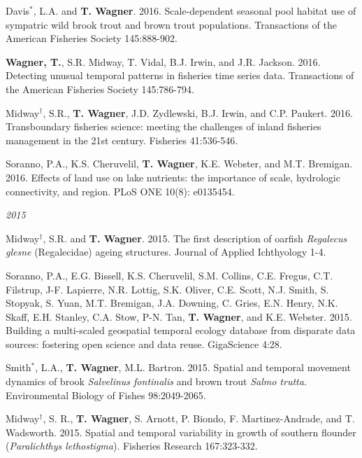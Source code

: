 \documentclass[10pt]{article}
\begin{document}
\begin{flushleft}
\begin{etaremune}[start=55]
\item Davis$^*$, L.A. and {\bf T. Wagner}. 2016. Scale-dependent seasonal pool habitat use of sympatric wild brook trout and brown trout populations. Transactions of the American Fisheries Society 145:888-902.

\item {\bf Wagner, T.}, S.R. Midway, T. Vidal, B.J. Irwin, and J.R. Jackson. 2016. Detecting unusual temporal patterns in fisheries time series data. Transactions of the American Fisheries Society 145:786-794.

\item Midway$^\dagger$, S.R., {\bf T. Wagner}, J.D. Zydlewski, B.J. Irwin, and C.P. Paukert. 2016. Transboundary fisheries science: meeting the challenges of inland fisheries management in the 21st century. Fisheries 41:536-546.

\item Soranno, P.A., K.S. Cheruvelil, {\bf T. Wagner}, K.E. Webster, and M.T. Bremigan. 2016. Effects of land use on lake nutrients: the importance of scale, hydrologic connectivity, and region. PLoS ONE  10(8): e0135454.

\end{etaremune}
\emph{2015}
\begin{etaremune}[start=48]
\item Midway$^\dagger$, S.R. and {\bf T. Wagner}. 2015. The first description of oarfish \emph{Regalecus glesne} (Regalecidae) ageing structures. Journal of Applied Ichthyology 1-4.

\item Soranno, P.A., E.G. Bissell, K.S. Cheruvelil, S.M. Collins, C.E. Fregus, C.T. Filstrup, J-F. Lapierre, N.R. Lottig, S.K. Oliver, C.E. Scott, N.J. Smith, S. Stopyak, S. Yuan, M.T. Bremigan, J.A. Downing, C. Gries, E.N. Henry, N.K. Skaff, E.H. Stanley, C.A. Stow, P-N. Tan, {\bf T. Wagner}, and K.E. Webster. 2015. Building a multi-scaled geospatial temporal ecology database from disparate data sources: fostering open science and data reuse. GigaScience 4:28.

\item Smith$^*$, L.A., {\bf T. Wagner}, M.L. Bartron. 2015. Spatial and temporal movement dynamics of brook \emph{Salvelinus fontinalis} and brown trout \emph{Salmo trutta}. Environmental Biology of Fishes 98:2049-2065.

\item Midway$^\dagger$, S. R., {\bf T. Wagner}, S. Arnott, P. Biondo, F. Martinez-Andrade, and T. Wadsworth. 2015. Spatial and temporal variability in growth of southern flounder (\emph{Paralichthys lethostigma}). Fisheries Research 167:323-332.


\end{etaremune}
\end{flushleft}
\end{document}
